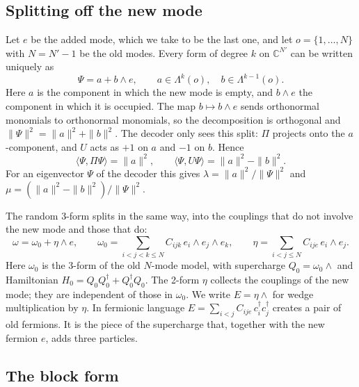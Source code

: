 \documentclass[11pt]{article}
\newcommand{\Np}{N'}
\newcommand{\ip}[2]{\langle #1,#2\rangle}
\theoremstyle{plain}
\theoremstyle{remark}
\numberwithin{equation}{section}
\begin{document}
\subsection{Splitting off the new mode}

Let $e$ be the added mode, which we take to be the last one, and let $o=\{1,\dots,N\}$ with $N=\Np-1$ be the old modes.
Every form of degree $k$ on $\mathbb C^{\Np}$ can be written uniquely as
\begin{equation}\label{eq:split}
\Psi = a + b\wedge e,\qquad a\in\Lambda^k(o),\quad b\in\Lambda^{k-1}(o).
\end{equation}
Here $a$ is the component in which the new mode is empty, and $b\wedge e$ the component in which it is occupied. The map
$b\mapsto b\wedge e$ sends orthonormal monomials to orthonormal monomials, so the decomposition is orthogonal and
$\|\Psi\|^2=\|a\|^2+\|b\|^2$. The decoder only sees this split: $\Pi$ projects onto the $a$-component, and $U$ acts as
$+1$ on $a$ and $-1$ on $b$. Hence
\begin{equation}\label{eq:decoder-forms}
\ip{\Psi}{\Pi\Psi}=\|a\|^2,\qquad \ip{\Psi}{U\Psi}=\|a\|^2-\|b\|^2 .
\end{equation}
For an eigenvector $\Psi$ of the decoder this gives $\lambda=\|a\|^2/\|\Psi\|^2$ and
$\mu=(\|a\|^2-\|b\|^2)/\|\Psi\|^2$.

The random 3-form splits in the same way, into the couplings that do not involve the new mode and those that do:
\begin{equation}\label{eq:omega-split}
\omega=\omega_0+\eta\wedge e,\qquad
\omega_0=\sum_{i<j<k\le N}C_{ijk}\,e_i\wedge e_j\wedge e_k,\qquad
\eta=\sum_{i<j\le N}C_{ije}\,e_i\wedge e_j .
\end{equation}
Here $\omega_0$ is the 3-form of the old $N$-mode model, with supercharge $Q_0=\omega_0\wedge$ and Hamiltonian
$H_0=Q_0Q_0^\dagger+Q_0^\dagger Q_0$. The 2-form $\eta$ collects the couplings of the new mode; they are independent of
those in $\omega_0$. We write $E=\eta\wedge$ for wedge multiplication by $\eta$. In fermionic language
$E=\sum_{i<j}C_{ije}\,c_i^\dagger c_j^\dagger$ creates a pair of old fermions. It is the piece of the supercharge that,
together with the new fermion $e$, adds three particles.

\subsection{The block form}
\end{document}
